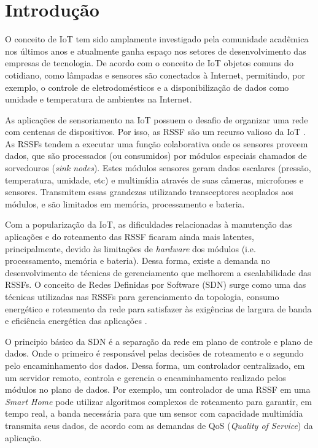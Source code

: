 \chapter{Introdução}
\label{c_introducao}

O conceito de \ac{IoT} tem sido amplamente investigado pela comunidade acadêmica nos últimos anos e atualmente ganha espaço nos setores de desenvolvimento das empresas de tecnologia. De acordo com o conceito de \ac{IoT} objetos comuns do cotidiano, como lâmpadas e sensores são conectados à Internet, permitindo, por exemplo, o controle de eletrodomésticos e a disponibilização de dados como umidade e temperatura de ambientes na Internet. 

As aplicações de sensoriamento na \ac{IoT} possuem o desafio de organizar uma rede com centenas de dispositivos. Por isso, as \ac{RSSF} são um recurso valioso da \ac{IoT} \cite{Capella}. As \ac{RSSF}s tendem a executar uma função colaborativa onde os sensores proveem dados, que são processados (ou consumidos) por módulos especiais chamados de sorvedouros (\textit{sink nodes}). Estes módulos sensores geram dados escalares (pressão, temperatura, umidade, etc) e multimídia através de suas câmeras, microfones e sensores. Transmitem essas grandezas utilizando transceptores acoplados aos módulos, e são limitados em memória, processamento e bateria.

Com a popularização da \ac{IoT}, as dificuldades relacionadas à manutenção das aplicações e do roteamento das \ac{RSSF} ficaram ainda mais latentes, principalmente, devido às limitações de \textit{hardware} dos módulos (i.e. processamento, memória e bateria). Dessa forma, existe a demanda no desenvolvimento de técnicas de gerenciamento que melhorem a escalabilidade das RSSFs. O conceito de Redes Definidas por Software (\ac{SDN}) surge como uma das técnicas utilizadas nas \ac{RSSF}s para gerenciamento da topologia, consumo energético e roteamento da rede para satisfazer às exigências de largura de banda e eficiência energética das aplicações \cite{Ndiaye}.

O principio básico da \ac{SDN} é a separação da rede em plano de controle e plano de dados. Onde o primeiro é responsável pelas decisões de roteamento e o segundo pelo encaminhamento dos dados. Dessa forma, um controlador centralizado, em um servidor remoto, controla e gerencia o encaminhamento realizado pelos módulos no plano de dados. Por exemplo, um controlador de uma \ac{RSSF} em uma \textit{Smart Home} pode utilizar algoritmos complexos de roteamento para garantir, em tempo real, a banda necessária para que um sensor com capacidade multimídia transmita seus dados, de acordo com as demandas de \ac{QoS} (\textit{Quality of Service}) da aplicação. 

